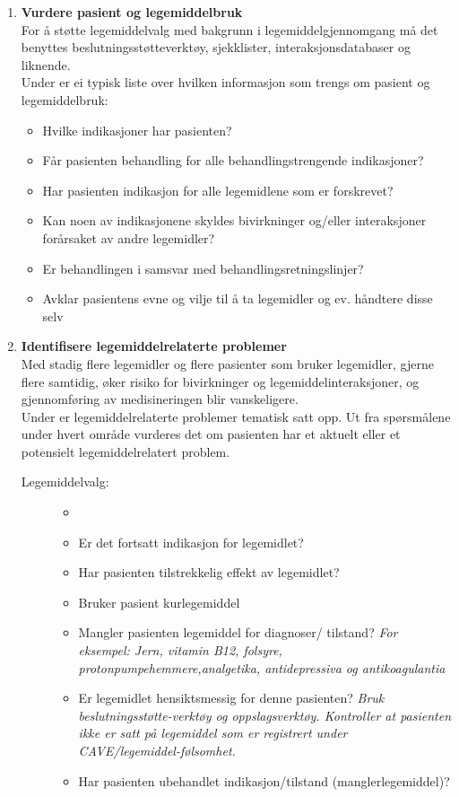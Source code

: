 \begin{enumerate}
\item \textbf{Vurdere pasient og legemiddelbruk}\\
For å støtte legemiddelvalg med bakgrunn i legemiddelgjennomgang må det benyttes beslutningsstøtteverktøy, sjekklister, interaksjonsdatabaser og liknende.\\
Under er ei typisk liste over hvilken informasjon som trengs om pasient og legemiddelbruk:
\begin{itemize}
\item Hvilke indikasjoner har pasienten?
\item Får pasienten behandling for alle behandlingstrengende indikasjoner?
\item Har pasienten indikasjon for alle legemidlene som er forskrevet?
\item Kan noen av indikasjonene skyldes bivirkninger og/eller interaksjoner forårsaket av andre legemidler?
\item Er behandlingen i samsvar med behandlingsretningslinjer?
\item Avklar pasientens evne og vilje til å ta legemidler og ev. håndtere disse selv 
\end{itemize}

\item 
\textbf{Identifisere legemiddelrelaterte problemer}\\
 Med stadig flere legemidler og flere pasienter som bruker legemidler, gjerne flere samtidig, øker risiko for bivirkninger og legemiddelinteraksjoner, og gjennomføring av medisineringen blir vanskeligere. \citep{DNL_klassifisering_av_legemiddelrelaterte_problemer} \\

Under er legemiddelrelaterte problemer tematisk satt opp. Ut fra spørsmålene under hvert område vurderes det om pasienten har et aktuelt eller et potensielt legemiddelrelatert problem.\citep{Helsedirektoratet_veileder_LMG}

\begin{description}
\item[Legemiddelvalg:]
    \begin{itemize}
    \item[]
    \item Er det fortsatt indikasjon for legemidlet?
  \item Har pasienten tilstrekkelig effekt av legemidlet?
  \item Bruker pasient kurlegemiddel
  \item Mangler pasienten legemiddel for diagnoser/ tilstand? \textit{For eksempel: Jern, vitamin B12, folsyre, protonpumpehemmere,analgetika, antidepressiva og antikoagulantia}
  \item Er legemidlet hensiktsmessig for denne pasienten? \textit{ Bruk beslutningsstøtte-verktøy og oppslagsverktøy. Kontroller at pasienten ikke er satt på legemiddel som er registrert under CAVE/legemiddel-følsomhet.}
  \item Har pasienten ubehandlet indikasjon/tilstand (manglerlegemiddel)?
\end{itemize}


\end{description}
\end{enumerate}
